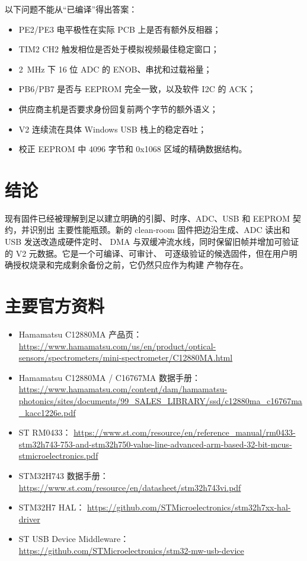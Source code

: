 \documentclass[UTF8,fontset=windows,11pt]{ctexart}
\begin{document}
\begin{warningbox}
以下问题不能从“已编译”得出答案：
\begin{itemize}
  \item PE2/PE3 电平极性在实际 PCB 上是否有额外反相器；
  \item TIM2 CH2 触发相位是否处于模拟视频最佳稳定窗口；
  \item \SI{2}{MHz} 下 16 位 ADC 的 ENOB、串扰和过载裕量；
  \item PB6/PB7 是否与 EEPROM 完全一致，以及软件 I2C 的 ACK；
  \item 供应商主机是否要求身份回复前两个字节的额外语义；
  \item V2 连续流在具体 Windows USB 栈上的稳定吞吐；
  \item 校正 EEPROM 中 4096 字节和 0x1068 区域的精确数据结构。
\end{itemize}
\end{warningbox}

\section{结论}

现有固件已经被理解到足以建立明确的引脚、时序、ADC、USB 和 EEPROM 契约，并识别出
主要性能瓶颈。新的 clean-room 固件把边沿生成、ADC 读出和 USB 发送改造成硬件定时、
DMA 与双缓冲流水线，同时保留旧帧并增加可验证的 V2 元数据。它是一个可编译、可审计、
可逐级验证的候选固件，但在用户明确授权烧录和完成剩余备份之前，它仍然只应作为构建
产物存在。

\section*{主要官方资料}
\begin{itemize}
  \item Hamamatsu C12880MA 产品页：
    \url{https://www.hamamatsu.com/us/en/product/optical-sensors/spectrometers/mini-spectrometer/C12880MA.html}
  \item Hamamatsu C12880MA / C16767MA 数据手册：
    \url{https://www.hamamatsu.com/content/dam/hamamatsu-photonics/sites/documents/99_SALES_LIBRARY/ssd/c12880ma_c16767ma_kacc1226e.pdf}
  \item ST RM0433：
    \url{https://www.st.com/resource/en/reference_manual/rm0433-stm32h743-753-and-stm32h750-value-line-advanced-arm-based-32-bit-mcus-stmicroelectronics.pdf}
  \item STM32H743 数据手册：
    \url{https://www.st.com/resource/en/datasheet/stm32h743vi.pdf}
  \item STM32H7 HAL：
    \url{https://github.com/STMicroelectronics/stm32h7xx-hal-driver}
  \item ST USB Device Middleware：
    \url{https://github.com/STMicroelectronics/stm32-mw-usb-device}
\end{itemize}
\end{document}
